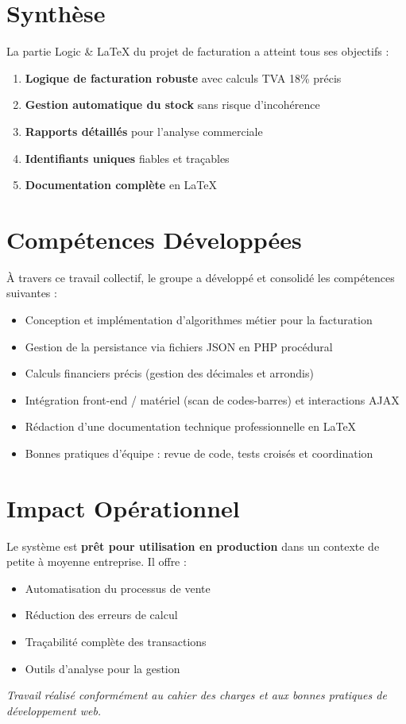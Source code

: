 \documentclass[12pt,a4paper]{report}
\begin{document}
\section{Synthèse}

La partie Logic \& LaTeX du projet de facturation a atteint tous ses objectifs :

\begin{enumerate}
    \item \textbf{Logique de facturation robuste} avec calculs TVA 18\% précis
    \item \textbf{Gestion automatique du stock} sans risque d'incohérence
    \item \textbf{Rapports détaillés} pour l'analyse commerciale
    \item \textbf{Identifiants uniques} fiables et traçables
    \item \textbf{Documentation complète} en LaTeX
\end{enumerate}

\section{Compétences Développées}

À travers ce travail collectif, le groupe a développé et consolidé les compétences suivantes :

\begin{itemize}
    \item Conception et implémentation d'algorithmes métier pour la facturation
    \item Gestion de la persistance via fichiers JSON en PHP procédural
    \item Calculs financiers précis (gestion des décimales et arrondis)
    \item Intégration front-end / matériel (scan de codes-barres) et interactions AJAX
    \item Rédaction d'une documentation technique professionnelle en LaTeX
    \item Bonnes pratiques d'équipe : revue de code, tests croisés et coordination
\end{itemize}

\section{Impact Opérationnel}

Le système est \textbf{prêt pour utilisation en production} dans un contexte de petite à moyenne entreprise. Il offre :

\begin{itemize}
    \item Automatisation du processus de vente
    \item Réduction des erreurs de calcul
    \item Traçabilité complète des transactions
    \item Outils d'analyse pour la gestion
\end{itemize}

\vspace{1cm}

\textit{Travail réalisé conformément au cahier des charges et aux bonnes pratiques de développement web.}
\end{document}
